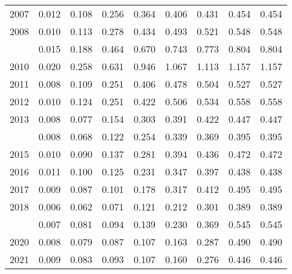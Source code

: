 \documentclass[
]{article}
\begin{document}
\begin{longtable}[t]{lrrrrrrrr}
2007 & 0.012 & 0.108 & 0.256 & 0.364 & 0.406 & 0.431 & 0.454 & 0.454\\
2008 & 0.010 & 0.113 & 0.278 & 0.434 & 0.493 & 0.521 & 0.548 & 0.548\\
\addlinespace
2009 & 0.015 & 0.188 & 0.464 & 0.670 & 0.743 & 0.773 & 0.804 & 0.804\\
2010 & 0.020 & 0.258 & 0.631 & 0.946 & 1.067 & 1.113 & 1.157 & 1.157\\
2011 & 0.008 & 0.109 & 0.251 & 0.406 & 0.478 & 0.504 & 0.527 & 0.527\\
2012 & 0.010 & 0.124 & 0.251 & 0.422 & 0.506 & 0.534 & 0.558 & 0.558\\
2013 & 0.008 & 0.077 & 0.154 & 0.303 & 0.391 & 0.422 & 0.447 & 0.447\\
\addlinespace
2014 & 0.008 & 0.068 & 0.122 & 0.254 & 0.339 & 0.369 & 0.395 & 0.395\\
2015 & 0.010 & 0.090 & 0.137 & 0.281 & 0.394 & 0.436 & 0.472 & 0.472\\
2016 & 0.011 & 0.100 & 0.125 & 0.231 & 0.347 & 0.397 & 0.438 & 0.438\\
2017 & 0.009 & 0.087 & 0.101 & 0.178 & 0.317 & 0.412 & 0.495 & 0.495\\
2018 & 0.006 & 0.062 & 0.071 & 0.121 & 0.212 & 0.301 & 0.389 & 0.389\\
\addlinespace
2019 & 0.007 & 0.081 & 0.094 & 0.139 & 0.230 & 0.369 & 0.545 & 0.545\\
2020 & 0.008 & 0.079 & 0.087 & 0.107 & 0.163 & 0.287 & 0.490 & 0.490\\
2021 & 0.009 & 0.083 & 0.093 & 0.107 & 0.160 & 0.276 & 0.446 & 0.446\\*
\end{longtable}
\end{document}
